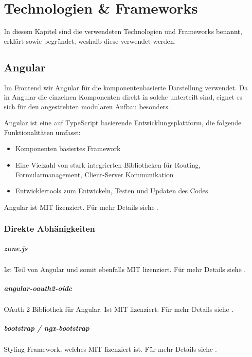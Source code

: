 \chapter{Technologien & Frameworks}\label{ch:technologien-&-frameworks}

In diesem Kapitel sind die verwendeten Technologien und Frameworks benannt, erklärt
sowie begründet, weshalb diese verwendet werden.

\section{Angular}\label{sec:angular}

Im Frontend wir Angular für die komponentenbasierte Darstellung verwendet.
Da in Angular die einzelnen Komponenten direkt in solche unterteilt sind,
eignet es sich für den angestrebten modularen Aufbau besonders.

Angular ist eine auf \gls{TypeScript} basierende Entwicklungsplattform, die folgende Funktionalitäten umfasst:
\begin{itemize}
    \item Komponenten basiertes Framework
    \item Eine Vielzahl von stark integrierten Bibliotheken für Routing, Formularmanagement, Client-Server Kommunikation
    \item Entwicklertools zum Entwickeln, Testen und Updaten des Codes
\end{itemize}
\cite{about-angular}

Angular ist MIT lizenziert.
Für mehr Details siehe .

\subsection{Direkte Abhänigkeiten}

\paragraph{zone.js}
Ist Teil von Angular und somit ebenfalls MIT lizenziert.
Für mehr Details siehe .

\paragraph{angular-oauth2-oidc}
OAuth 2 Bibliothek für Angular.
Ist MIT lizenziert.
Für mehr Details siehe .

\paragraph{bootstrap / ngx-bootstrap}
Styling Framework, welches MIT lizenziert ist.
Für mehr Details siehe .

